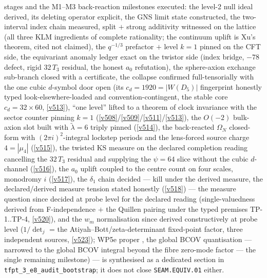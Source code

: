 \documentclass[11pt,a4paper]{article}
\begin{document}
\begin{keybox}
stages and the
M1--M3 back-reaction milestones executed:
the level-2 null ideal derived, its deleting operator explicit, the GNS limit state constructed, the
two-interval index chain measured, split $+$ strong additivity witnessed on the lattice (all three
KLM ingredients of complete rationality; the continuum uplift is Xu's theorem, cited not claimed),
the $q^{-1/3}$ prefactor $+$ level $k{=}1$ pinned on the CFT
side, the equivariant anomaly ledger exact on the twistor side (index bridge, $-78$ defect,
rigid $32\,T_3$ residual, the honest $a_0$ refutation), the sphere-axion exchange sub-branch closed
with a certificate, the collapse confirmed full-tensorially with the one cubic $d$-symbol door
open (its $c_d=1920=|W(D_5)|$ fingerprint honestly typed look-elsewhere-loaded and
convention-contingent, the stable core $c_d=32\times60$, \vref{v513}), ``one level'' lifted to
a theorem of clock invariance with the sector
counter pinning $k=1$ (\vref{v508}/\vref{v509}/\vref{v511}/\vref{v513}), the $O(-2)$ bulk-axion
slot built with $\tilde\lambda=6$ triply pinned (\vref{v514}), the back-reacted $\Omega_N$
closed-form with $(2\pi i)^2$-integral lockstep periods and the lens-forced source charge
$4=|\mu_4|$ (\vref{v515}), the twisted KS measure on the declared completion reading cancelling
the $32\,T_3$ residual and supplying the $\psi=64$ slice without the cubic $d$-channel
(\vref{v516}), the $a_0$ uplift coupled to the centre count on four scales, monodromy $i$
(\vref{v517}), the $\delta_1$ chain decided --- kill under the derived measure, the
declared/derived measure tension stated honestly (\vref{v518}) --- the measure question
since decided at probe level for the declared reading (single-valuedness derived from
F-independence $+$ the Quillen pairing under the typed premises TP-1..TP-4, \vref{v520}),
and the $w_m$ normalisation since derived constructively at probe level ($1/\det_j$ = the
Atiyah--Bott/zeta-determinant fixed-point factor, three independent sources, \vref{v523});
WP5e proper \mO, the global BCOV
quantisation --- narrowed to the global BCOV integral beyond the fibre zero-mode factor ---
the single remaining milestone) --- is
synthesised as a
dedicated section in \texttt{tfpt\_3\_e8\_audit\_bootstrap}; it does not close \texttt{SEAM.EQUIV.01}
either.
\end{keybox}
\end{document}
